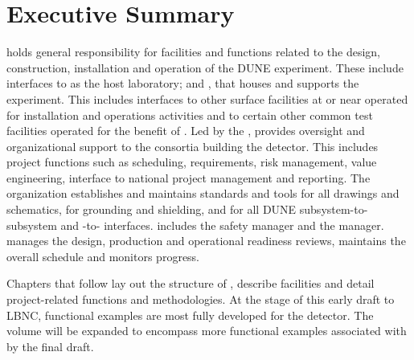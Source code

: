 \chapter{Executive Summary}
\label{vl:tc-execsum}


  holds general responsibility for
facilities and functions related to the design, construction,
installation and operation of the DUNE experiment. These
include interfaces to \fnal as the host laboratory; 
and , that houses and supports the  experiment. This
includes interfaces to other surface facilities at or near \surf
operated for installation and operations activities and to certain
other common test facilities operated for the benefit of
. Led by the  , 
 provides oversight and organizational support to the
consortia building the  detector.  This includes project
functions such as scheduling, requirements, risk management, value
engineering, interface to national project management and
reporting. The  organization establishes and maintains
standards and tools for all drawings and schematics, for grounding and
shielding, and for all DUNE subsystem-to-subsystem and
-to- interfaces.   includes the
 safety manager and the  
manager.   manages the design, production and
operational readiness reviews, maintains the overall schedule and
monitors progress.

Chapters that follow lay out the structure of 
, describe  facilities and detail
project-related functions and methodologies. At the stage of this
early draft to LBNC,   functional examples are most fully
developed for the  detector. The volume will be expanded to
encompass more functional examples associated with 
 by the final draft.

